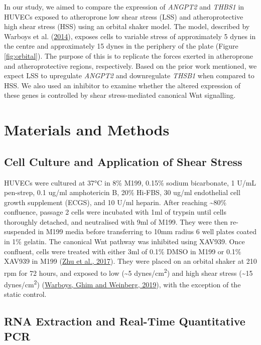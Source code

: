 \documentclass[
  11pt,
]{article}
\begin{document}
In our study, we aimed to compare the expression of \emph{ANGPT2} and \emph{THBS1} in HUVECs exposed to atheroprone low shear stress (LSS) and atheroprotective high shear stress (HSS) using an orbital shaker model.
The model, described by Warboys et al. (\protect\hyperlink{ref-Warboys2014}{2014}), exposes cells to variable stress of approximately 5 dynes in the centre and approximately 15 dynes in the periphery of the plate (Figure \ref{fig:orbital}).
The purpose of this is to replicate the forces exerted in atheroprone and atheroprotective regions, respectively.
Based on the prior work mentioned, we expect LSS to upregulate \emph{ANGPT2} and downregulate \emph{THSB1} when compared to HSS.
We also used an inhibitor to examine whether the altered expression of these genes is controlled by shear stress-mediated canonical Wnt signalling.

\hypertarget{materials-and-methods}{%
\section{Materials and Methods}\label{materials-and-methods}}

\hypertarget{cell-culture-and-application-of-shear-stress}{%
\subsection{Cell Culture and Application of Shear Stress}\label{cell-culture-and-application-of-shear-stress}}

HUVECs were cultured at 37°C in 8\% M199, 0.15\% sodium bicarbonate, 1 U/mL pen-strep, 0.1 ug/ml amphotericin B, 20\% Hi-FBS, 30 ug/ml endothelial cell growth supplement (ECGS), and 10 U/ml heparin.
After reaching \textasciitilde80\% confluence, passage 2 cells were incubated with 1ml of trypsin until cells thoroughly detached, and neutralised with 9ml of M199.
They were then re-suspended in M199 media before transferring to 10mm radius 6 well plates coated in 1\% gelatin.
The canonical Wnt pathway was inhibited using XAV939.
Once confluent, cells were treated with either 3ml of 0.1\% DMSO in M199 or 0.1\% XAV939 in M199 (\protect\hyperlink{ref-Zhu2017}{Zhu et al., 2017}).
They were placed on an orbital shaker at 210 rpm for 72 hours, and exposed to low (\textasciitilde5 dynes/cm\textsuperscript{2}) and high shear stress (\textasciitilde15 dynes/cm\textsuperscript{2}) (\protect\hyperlink{ref-Warboys2019}{Warboys, Ghim and Weinberg, 2019}), with the exception of the static control.

\hypertarget{rna-extraction-and-real-time-quantitative-pcr}{%
\subsection{RNA Extraction and Real-Time Quantitative PCR}\label{rna-extraction-and-real-time-quantitative-pcr}}
\end{document}
